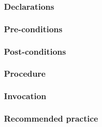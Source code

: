 \def\Subsubsection#1{\subsubsection{#1}}

\Subsubsection{Declarations}

\Subsubsection{Pre-conditions}

\Subsubsection{Post-conditions}

\Subsubsection{Procedure}

\Subsubsection{Invocation}

\Subsubsection{Recommended practice}
